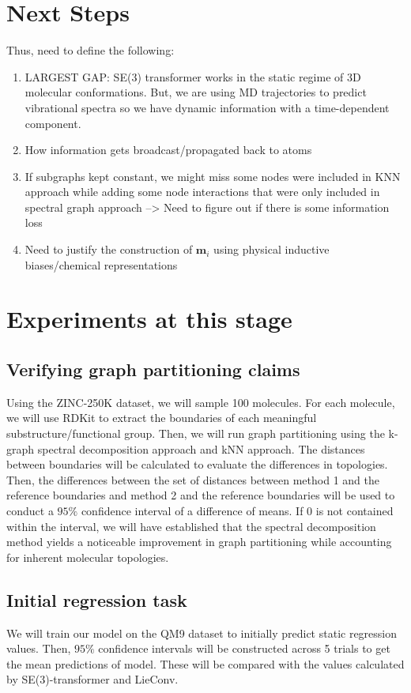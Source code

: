 \documentclass{article}
\begin{document}
\section{Next Steps}
\noindent Thus, need to define the following:
\begin{enumerate}
  \item LARGEST GAP: SE(3) transformer works in the static regime of 3D molecular conformations. But, we are using MD trajectories to predict vibrational spectra so we have dynamic information with a time-dependent component. 
  \item How information gets broadcast/propagated back to atoms 
  \item If subgraphs kept constant, we might miss some nodes were included in KNN approach while adding some node interactions that were only included in spectral graph approach --> Need to figure out if there is some information loss
  \item Need to justify the construction of $\mathbf{m}_i$ using physical inductive biases/chemical representations 
\end{enumerate}

\section{Experiments at this stage}
\subsection{Verifying graph partitioning claims}
Using the ZINC-250K dataset, we will sample 100 molecules. For each molecule, we will use RDKit to extract the boundaries of each meaningful substructure/functional group. Then, we will run graph partitioning using the k-graph spectral decomposition approach and kNN approach. The distances between boundaries will be calculated to evaluate the differences in topologies. Then, the differences between the set of distances between method 1 and the reference boundaries and method 2 and the reference boundaries will be used to conduct a $95\%$ confidence interval of a difference of means. If 0 is not contained within the interval, we will have established that the spectral decomposition method yields a noticeable improvement in graph partitioning while accounting for inherent molecular topologies.

\subsection{Initial regression task}
We will train our model on the QM9 dataset to initially predict static regression values. Then, $95\%$ confidence intervals will be constructed across 5 trials to get the mean predictions of model. These will be compared with the values calculated by SE(3)-transformer and LieConv. 
\end{document}
